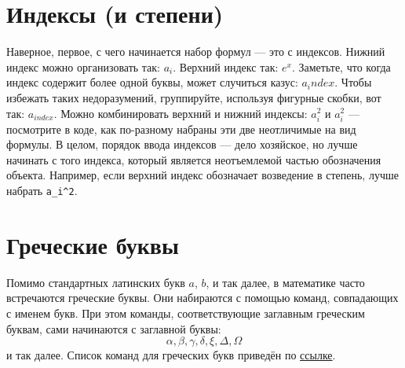 \section{Индексы (и степени)}
\par Наверное, первое, с чего начинается набор формул --- это с индексов.
Нижний индекс можно организовать так: \(a_i\).
Верхний индекс так: \(e^x\).
Заметьте, что когда индекс содержит более одной буквы, может случиться казус: $a_index$. Чтобы избежать таких недоразумений, группируйте, используя фигурные скобки, вот так: $a_{index}$.
Можно комбинировать верхний и нижний индексы: $a_i^2$ и $a^2_i$ --- посмотрите в коде, как по-разному набраны эти две неотличимые на вид формулы. В целом, порядок ввода индексов --- дело хозяйское, но лучше начинать с того индекса, который является неотъемлемой частью обозначения объекта. Например, если верхний индекс обозначает возведение в степень, лучше набрать \verb"a_i^2".

\section{Греческие буквы}
\par Помимо стандартных латинских букв $a$, $b$, и так далее, в математике часто встречаются греческие буквы. Они набираются с помощью команд, совпадающих с именем букв. При этом команды, соответствующие заглавным греческим буквам, сами начинаются с заглавной буквы:
\[\alpha, \beta, \gamma, \delta, \xi, \Delta, \Omega\]
и так далее. Список команд для греческих букв приведён по \href{https://www.latex-tutorial.com/symbols/greek-alphabet/}{ссылке}.

